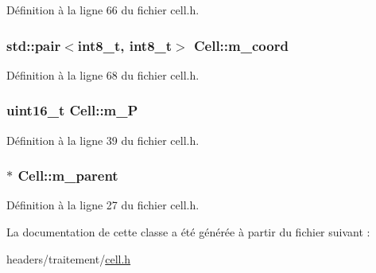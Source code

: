 Définition à la ligne 66 du fichier cell.\-h.

\hypertarget{class_cell_a085171fb910218539ba90994051f2156}{
\subsubsection[{m\-\_\-coord}]{\setlength{\rightskip}{0pt plus 5cm}std\-::pair$<$int8\-\_\-t, int8\-\_\-t$>$ Cell\-::m\-\_\-coord\hspace{0.3cm}{\ttfamily [private]}}}\label{class_cell_a085171fb910218539ba90994051f2156}


Définition à la ligne 68 du fichier cell.\-h.

\hypertarget{class_cell_aa47b258f5356e76a577a5035b6e1cf59}{
\subsubsection[{m\-\_\-\-P}]{\setlength{\rightskip}{0pt plus 5cm}uint16\-\_\-t Cell\-::m\-\_\-\-P}}\label{class_cell_aa47b258f5356e76a577a5035b6e1cf59}


Définition à la ligne 39 du fichier cell.\-h.

\hypertarget{class_cell_a1d30ec2a94e3ba2bec541d978f55c9bc}{
\subsubsection[{m\-\_\-parent}]{$\ast$ Cell\-::m\-\_\-parent}}\label{class_cell_a1d30ec2a94e3ba2bec541d978f55c9bc}


Définition à la ligne 27 du fichier cell.\-h.



La documentation de cette classe a été générée à partir du fichier suivant \-:\begin{DoxyCompactItemize}
\item 
headers/traitement/\hyperlink{cell_8h}{cell.\-h}\end{DoxyCompactItemize}
